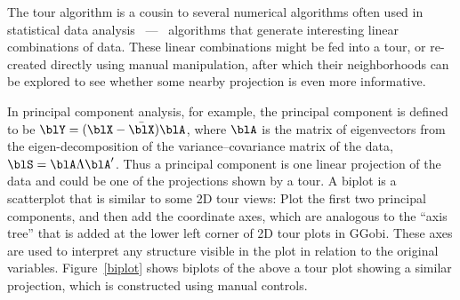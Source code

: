 


\bigskip
{}

The tour algorithm is a cousin to several numerical algorithms often
used in statistical data analysis ~---~ algorithms that generate
interesting linear combinations of data. These linear combinations
might be fed into a tour, or re-created directly using manual
manipulation, after which their neighborhoods can be explored to see
whether some nearby projection is even more informative.


In principal component analysis, for example, the principal component
is defined to be $\blY = (\blX-\bar{\blX})\blA$, where $\blA$ is the
matrix of eigenvectors from the eigen-decomposition of the
variance--covariance matrix of the data, $\blS =
\blA\Lambda\blA'$. Thus a principal component is one linear projection
of the data and could be one of the projections shown by a tour.  A
biplot \cite{Ga71,GH96} is a scatterplot that is similar to some 2D
tour views: Plot the first two principal components, and then add the
coordinate axes, which are analogous to the ``axis tree'' that is
added at the lower left corner of 2D tour plots in GGobi.  These axes
are used to interpret any structure visible in the plot in relation to
the original variables. Figure~\ref{biplot} shows biplots of the
 above a tour plot showing a similar
projection, which is constructed using manual controls.

